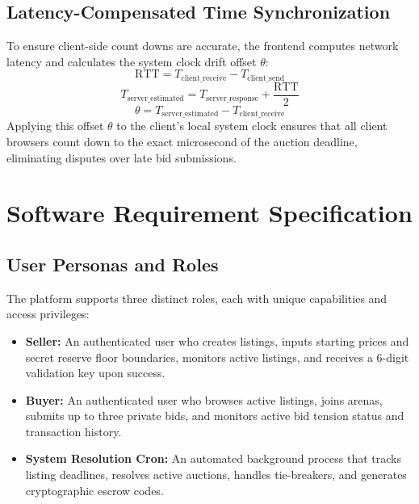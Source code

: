 \documentclass[12pt,a4paper,oneside]{report}
\begin{document}
\section{Latency-Compensated Time Synchronization}
To ensure client-side count downs are accurate, the frontend computes network latency and calculates the system clock drift offset $\theta$:
\begin{equation}
\text{RTT} = T_{\text{client\_receive}} - T_{\text{client\_send}}
\end{equation}
\begin{equation}
T_{\text{server\_estimated}} = T_{\text{server\_response}} + \frac{\text{RTT}}{2}
\end{equation}
\begin{equation}
\theta = T_{\text{server\_estimated}} - T_{\text{client\_receive}}
\end{equation}
Applying this offset $\theta$ to the client's local system clock ensures that all client browsers count down to the exact microsecond of the auction deadline, eliminating disputes over late bid submissions.

\chapter{Software Requirement Specification}

\section{User Personas and Roles}
The platform supports three distinct roles, each with unique capabilities and access privileges:
\begin{itemize}
    \item \textbf{Seller:} An authenticated user who creates listings, inputs starting prices and secret reserve floor boundaries, monitors active listings, and receives a 6-digit validation key upon success.
    \item \textbf{Buyer:} An authenticated user who browses active listings, joins arenas, submits up to three private bids, and monitors active bid tension status and transaction history.
    \item \textbf{System Resolution Cron:} An automated background process that tracks listing deadlines, resolves active auctions, handles tie-breakers, and generates cryptographic escrow codes.
\end{itemize}
\end{document}
